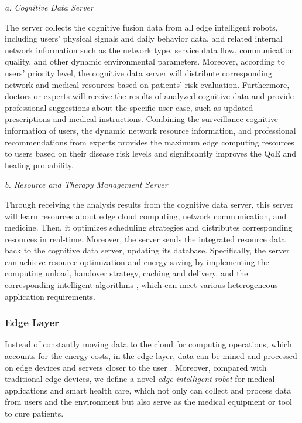 \documentclass[letterpaper]{article} %
\begin{document}
\textit{a. Cognitive Data Server}

The server collects the cognitive fusion data from all edge intelligent robots, including users' physical signals and daily behavior data, and related internal network information such as the network type, service data flow, communication quality, and other dynamic environmental parameters. Moreover, according to users' priority level, the cognitive data server will distribute corresponding network and medical resources based on patients' risk evaluation. Furthermore, doctors or experts will receive the results of analyzed cognitive data and provide professional suggestions about the specific user case, such as updated prescriptions and medical instructions. Combining the surveillance cognitive information of users, the dynamic network resource information, and professional recommendations from experts provides the maximum edge computing resources to users based on their disease risk levels and significantly improves the QoE and healing probability.

\textit{b. Resource and Therapy Management Server}

Through receiving the analysis results from the cognitive data server, this server will learn resources about edge cloud computing, network communication, and medicine. Then, it optimizes scheduling strategies and distributes corresponding resources in real-time. Moreover, the server sends the integrated resource data back to the cognitive data server, updating its database. Specifically, the server can achieve resource optimization and energy saving by implementing the computing unload, handover strategy, caching and delivery, and the corresponding intelligent algorithms \cite{chen2018edge}, which can meet various heterogeneous application requirements.

\subsubsection{Edge Layer}

Instead of constantly moving data to the cloud for computing operations, which accounts for the energy costs, in the edge layer, data can be mined and processed on edge devices and servers closer to the user \cite{bhargava2017fog}. Moreover, compared with traditional edge devices, we define a novel \textit{edge intelligent robot} for medical applications and smart health care, which not only can collect and process data from users and the environment but also serve as the medical equipment or tool to cure patients. 
\end{document}
